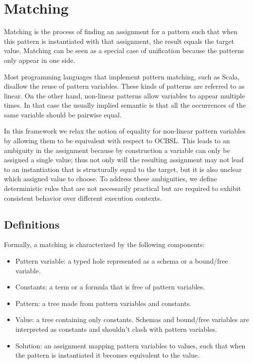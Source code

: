 \section{Matching}
\label{sec:matching}

Matching is the process of finding an assignment for a pattern such that when this pattern is instantiated with that assignment, the result equals the target value. Matching can be seen as a special case of unification because the patterns only appear in one side.

Most programming languages that implement pattern matching, such as Scala, disallow the reuse of pattern variables. These kinds of patterns are referred to as linear. On the other hand, non-linear patterns allow variables to appear multiple times. In that case the usually implied semantic is that all the occurrences of the same variable should be pairwise equal.

In this framework we relax the notion of equality for non-linear pattern variables by allowing them to be equivalent with respect to OCBSL. This leads to an ambiguity in the assignment because by construction a variable can only be assigned a single value; thus not only will the resulting assignment may not lead to an instantiation that is structurally equal to the target, but it is also unclear which assigned value to choose. To address these ambiguities, we define deterministic rules that are not necessarily practical but are required to exhibit consistent behavior over different execution contexts.

\subsection{Definitions}

Formally, a matching is characterized by the following components:

\begin{itemize}
\item Pattern variable: a typed hole represented as a schema or a bound/free variable.
\item Constants: a term or a formula that is free of pattern variables.
\item Pattern: a tree made from pattern variables and constants.
\item Value: a tree containing only constants. Schemas and bound/free variables are interpreted as constants and shouldn't clash with pattern variables.
\item Solution: an assignment mapping pattern variables to values, such that when the pattern is instantiated it becomes equivalent to the value.
\end{itemize}


